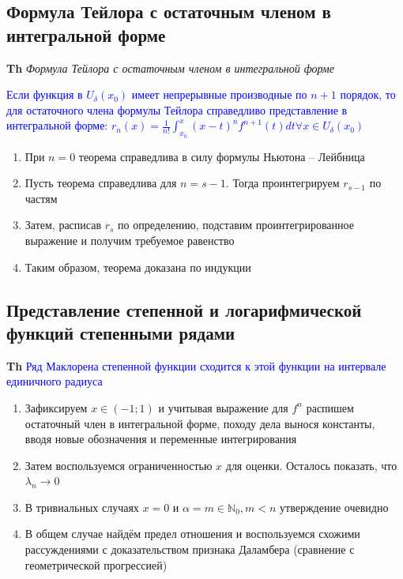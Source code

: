 \subsection{Формула Тейлора с остаточным членом в интегральной форме}

\textbf{Th} \textit{Формула Тейлора с остаточным членом в интегральной форме}

\textcolor{blue}{Если функция в $U_\delta (x_0)$ имеет непрерывные производные по $n+1$ порядок, то для
остаточного члена формулы Тейлора справедливо представление в интегральной форме: $r_n (x) = \frac{1}{n!} \int_{
    x_0}^x (x - t)^n f^{n+1}(t)dt \forall x \in U_\delta (x_0) $}

\begin{enumerate}
    \item При $n = 0$ теорема справедлива в силу формулы Ньютона -- Лейбница
    \item Пусть теорема справедлива для $n = s - 1$.
    Тогда проинтегрируем $r_{s-1}$ по частям
    \item Затем, расписав $r_s$ по определению, подставим проинтегрированное выражение и получим требуемое равенство
    \item Таким образом, теорема доказана по индукции
\end{enumerate}

\subsection{Представление степенной и логарифмической функций степенными рядами}

\textbf{Th} \textcolor{blue}{Ряд Маклорена степенной функции сходится к этой функции на интервале единичного радиуса}

\begin{enumerate}
    \item Зафиксируем $x \in (-1; 1)$ и учитывая выражение для $f^{n}$ распишем остаточный член в интегральной
    форме, походу дела вынося константы, вводя новые обозначения и переменные интегрирования
    \item Затем воспользуемся ограниченностью $x$ для оценки.
    Осталось показать, что $\lambda_n \rightarrow 0$
    \item В тривиальных случаях $x = 0$ и $\alpha = m \in \mathbb{N}_0, m < n$ утверждение очевидно
    \item В общем случае найдём предел отношения и воспользуемся схожими рассуждениями с доказательством признака
    Даламбера (сравнение с геометрической прогрессией)
\end{enumerate}

